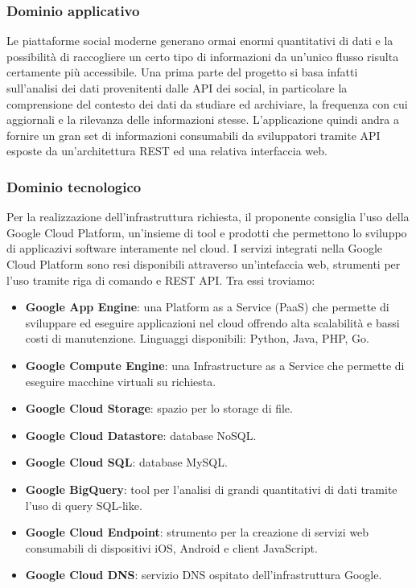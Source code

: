 \subsubsection{Dominio applicativo}
Le piattaforme social moderne generano ormai enormi quantitativi di dati e la possibilità di raccogliere un certo tipo di informazioni da un'unico flusso risulta certamente più accessibile. Una prima parte del progetto si basa infatti sull'analisi dei dati provenitenti dalle API dei social, in particolare la comprensione del contesto dei dati da studiare ed archiviare, la frequenza con cui aggiornali e la rilevanza delle informazioni stesse.
L'applicazione quindi andra a fornire un gran set di informazioni consumabili da sviluppatori tramite API esposte da un'architettura REST ed una relativa interfaccia web. 

\subsubsection{Dominio tecnologico}
Per la realizzazione dell'infrastruttura richiesta, il proponente consiglia l'uso della Google Cloud Platform, un'insieme di tool e prodotti che permettono lo sviluppo di applicazivi software interamente nel cloud. I servizi integrati nella Google Cloud Platform sono resi disponibili attraverso un'intefaccia web, strumenti per l'uso tramite riga di comando e REST API. Tra essi troviamo:
\begin{itemize}
\item \textbf{Google App Engine}: una Platform as a Service (PaaS) che permette di sviluppare ed eseguire applicazioni nel cloud offrendo alta scalabilità e bassi costi di manutenzione. Linguaggi disponibili: Python, Java, PHP, Go.
\item \textbf{Google Compute Engine}: una Infrastructure as a Service che permette di eseguire macchine virtuali su richiesta.
\item \textbf{Google Cloud Storage}: spazio per lo storage di file.
\item \textbf{Google Cloud Datastore}: database NoSQL.
\item \textbf{Google Cloud SQL}: database MySQL.
\item \textbf{Google BigQuery}: tool per l'analisi di grandi quantitativi di dati tramite l'uso di query SQL-like.
\item \textbf{Google Cloud Endpoint}: strumento per la creazione di servizi web consumabili di dispositivi iOS, Android e client JavaScript.
\item \textbf{Google Cloud DNS}: servizio DNS ospitato dell'infrastruttura Google.
\end{itemize}

